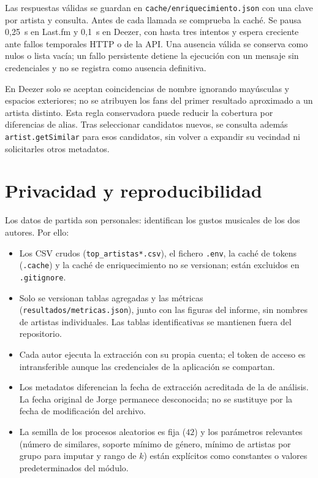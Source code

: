 Las respuestas válidas se guardan en \texttt{cache/enriquecimiento.json} con una clave por artista y consulta. Antes de cada llamada se comprueba la caché. Se pausa 0,25~s en Last.fm y 0,1~s en Deezer, con hasta tres intentos y espera creciente ante fallos temporales HTTP o de la API. Una ausencia válida se conserva como nulos o lista vacía; un fallo persistente detiene la ejecución con un mensaje sin credenciales y no se registra como ausencia definitiva.

En Deezer solo se aceptan coincidencias de nombre ignorando mayúsculas y espacios exteriores; no se atribuyen los fans del primer resultado aproximado a un artista distinto. Esta regla conservadora puede reducir la cobertura por diferencias de alias. Tras seleccionar candidatos nuevos, se consulta además \texttt{artist.getSimilar} para esos candidatos, sin volver a expandir su vecindad ni solicitarles otros metadatos.

\section{Privacidad y reproducibilidad}
\label{sec:privacidad}

Los datos de partida son personales: identifican los gustos musicales de los dos autores. Por ello:

\begin{itemize}
    \item Los CSV crudos (\texttt{top\_artistas*.csv}), el fichero \texttt{.env}, la caché de tokens (\texttt{.cache}) y la caché de enriquecimiento no se versionan; están excluidos en \texttt{.gitignore}.
    \item Solo se versionan tablas agregadas y las métricas (\nolinkurl{resultados/metricas.json}), junto con las figuras del informe, sin nombres de artistas individuales. Las tablas identificativas se mantienen fuera del repositorio.
    \item Cada autor ejecuta la extracción con su propia cuenta; el token de acceso es intransferible aunque las credenciales de la aplicación se compartan.
    \item Los metadatos diferencian la fecha de extracción acreditada de la de análisis. La fecha original de Jorge permanece desconocida; no se sustituye por la fecha de modificación del archivo.
    \item La semilla de los procesos aleatorios es fija ($42$) y los parámetros relevantes (número de similares, soporte mínimo de género, mínimo de artistas por grupo para imputar y rango de $k$) están explícitos como constantes o valores predeterminados del módulo.
\end{itemize}

